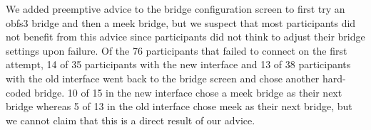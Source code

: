 \documentclass[USenglish,oneside,twocolumn]{article}
\begin{document}
%
%

We added preemptive advice to the bridge configuration screen to first try an obfs3 bridge and then a meek bridge, but we suspect that most participants did not benefit from this advice since participants did not think to adjust their bridge settings upon failure. Of the 76 participants that failed to connect on the first attempt, 14 of 35 participants with the new interface and 13 of 38 participants with the old interface went back to the bridge screen and chose another hard-coded bridge. 10 of 15 in the new interface chose a meek bridge as their next bridge whereas 5 of 13 in the old interface chose meek as their next bridge, but we cannot claim that this is a direct result of our advice.
\end{document}
